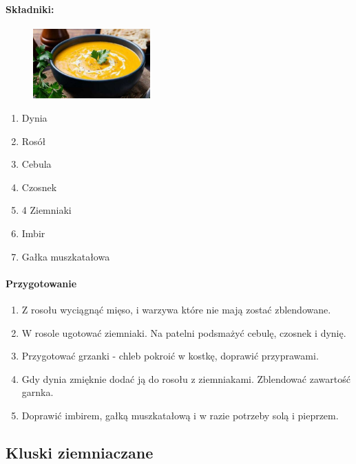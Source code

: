 \documentclass{article}
\begin{document}
    \paragraph{Składniki:}
    \begin{figure}
        \includegraphics[width=0.4\textwidth]{zupa_dyniowa.jpg}
    \end{figure}
    \begin{enumerate}
        \item Dynia
        \item Rosół
        \item Cebula
        \item Czosnek
        \item 4 Ziemniaki
        \item Imbir
        \item Gałka muszkatałowa
    \end{enumerate}

    \paragraph{Przygotowanie}
    \begin{enumerate}
        \item Z rosołu wyciągnąć mięso, i warzywa które nie mają zostać zblendowane.
        \item W rosole ugotować ziemniaki. Na patelni podsmażyć cebulę, czosnek i dynię.
        \item Przygotować grzanki - chleb pokroić w kostkę, doprawić przyprawami.
        \item Gdy dynia zmięknie dodać ją do rosołu z ziemniakami. Zblendować zawartość garnka.
        \item Doprawić imbirem, gałką muszkatałową i w razie potrzeby solą i pieprzem.
    \end{enumerate}
    \newpage


    \subsection{Kluski ziemniaczane}
    \bigskip
\end{document}

